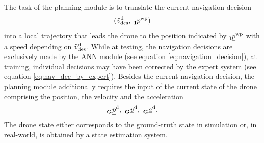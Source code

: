 
The task of the planning module is to translate the current navigation decision
\begin{equation}
    (
        \speed[\norm]{\drone}{\desired}{}{}
        ,\ 
        \pos[]{\wayp}{}{\irs}{}
    )
\end{equation}
into a local trajectory 
that leads the drone to the position indicated by
$
    \pos[]{\wayp}{}{\irs}{}
$
with a speed depending on
$
    \speed[\norm]{\drone}{\desired}{}{}
$.
While at testing, the navigation decisions are exclusively made by 
the ANN module (see equation \ref{eq:navigation_decision}),
at training,
individual decisions may have been corrected by
the expert system (see equation \ref{eq:nav_dec_by_expert}).
Besides the current navigation decision, 
the planning module additionally requires the input of the current
state of the drone comprising
the position, the velocity and the acceleration
\begin{equation}
    \pos[]{\drone}{}{\grs}{}
    ,\ 
    \vel[]{\drone}{}{\grs}{}
    ,\ 
    \acc[]{\drone}{}{\grs}{}.
\end{equation}
The drone state either corresponds to the ground-truth state in simulation or,
in real-world, is obtained by a state estimation system.


